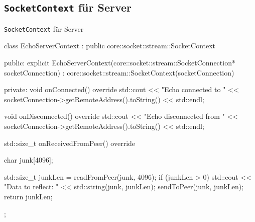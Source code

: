 \subsection{\texttt{SocketContext} für Server}

\begin{frame}[fragile]{\texttt{SocketContext} für Server}
  \begin{cppcode}[autogobble=true]
    class EchoServerContext : public core::socket::stream::SocketContext {
      public:
      explicit EchoServerContext(core::socket::stream::SocketConnection* socketConnection)
      : core::socket::stream::SocketContext(socketConnection) {
      }

      private:
      void onConnected() override {
        std::cout << "Echo connected to " << socketConnection->getRemoteAddress().toString() << std::endl;
      }

      void onDisconnected() override {
        std::cout << "Echo disconnected from " << socketConnection->getRemoteAddress().toString() << std::endl;
      }

      std::size_t onReceivedFromPeer() override {
        char junk[4096];

        std::size_t junkLen = readFromPeer(junk, 4096);
        if (junkLen > 0) {
          std::cout << "Data to reflect: " << std::string(junk, junkLen);
          sendToPeer(junk, junkLen);
        }
        return junkLen;
      }
    };
  \end{cppcode}
\end{frame}
